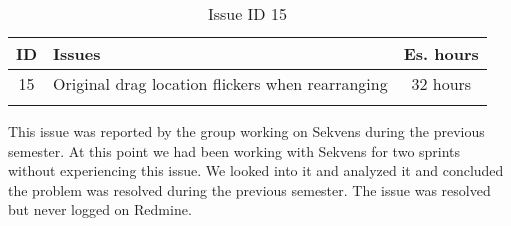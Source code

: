 \begin{longtable} { | c | p{12cm} | c | } 
\hline
	ID 	&	Issues	&		 Es. hours \\\hline
	15 	&	Original drag location flickers when rearranging	&	32 hours \\\hline
\caption{Issue ID 15}
\label{tab:spr2_flicker}
\end{longtable}

This issue was reported by the group working on Sekvens during the previous semester. At this point we had been working with Sekvens for two sprints without experiencing this issue. We looked into it and analyzed it and concluded the problem was resolved during the previous semester. The issue was resolved but never logged on Redmine.